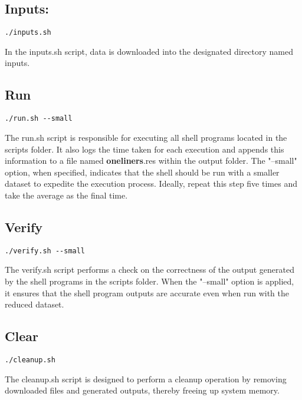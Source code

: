 \documentclass[sigplan, screen, 10pt]{acmart}
\begin{document}
\subsection{Inputs:}
\begin{verbatim}
./inputs.sh
\end{verbatim}
In the inputs.sh script, data is downloaded into the designated directory named inputs.
\subsection{Run}
\begin{verbatim}
./run.sh --small
\end{verbatim}
The run.sh script is responsible for executing all shell programs located in the scripts folder. It also logs the time taken for each execution and appends this information to a file named \textbf{oneliners}.res within the output folder. The "--small" option, when specified, indicates that the shell should be run with a smaller dataset to expedite the execution process. Ideally, repeat this step five times and take the average as the final time.
\subsection{Verify}
\begin{verbatim}
./verify.sh --small
\end{verbatim}
The verify.sh script performs a check on the correctness of the output generated by the shell programs in the scripts folder. When the "--small" option is applied, it ensures that the shell program outputs are accurate even when run with the reduced dataset.
\subsection{Clear}
\begin{verbatim}
./cleanup.sh
\end{verbatim}
The cleanup.sh script is designed to perform a cleanup operation by removing downloaded files and generated outputs, thereby freeing up system memory.
\end{document}
